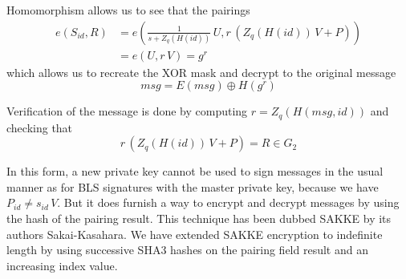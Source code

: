 \documentclass{yellowpaper}
\begin{document}
Homomorphism allows us to see that the pairings 
$$
\begin{align}
    e(S_{id}, R) &= e(\frac{1}{s + Z_q(H(id))}\, U, r\,(Z_q(H(id)) \, V + P)) \\
    &= e(U, r\, V) = g^r
\end{align}$$ 
which allows us to recreate the XOR mask and decrypt to the original message 
$$msg = E(msg) \oplus H(g^r)$$ 

Verification of the message is done by computing $r = Z_q(H(msg, id))$ and checking that 
$$r\, (Z_q(H(id))\, V + P) = R \in G_2$$

In this form, a new private key cannot be used to sign messages in the usual manner as for BLS signatures with the master private key, because we have $P_{id} \neq s_{id} \, V$. But it does furnish a way to encrypt and decrypt messages by using the hash of the pairing result. This technique has been dubbed SAKKE by its authors Sakai-Kasahara\cite{sakke}. We have extended SAKKE encryption to indefinite length by using successive SHA3 hashes on the pairing field result and an increasing index value.

\balance


%   
\end{document}
